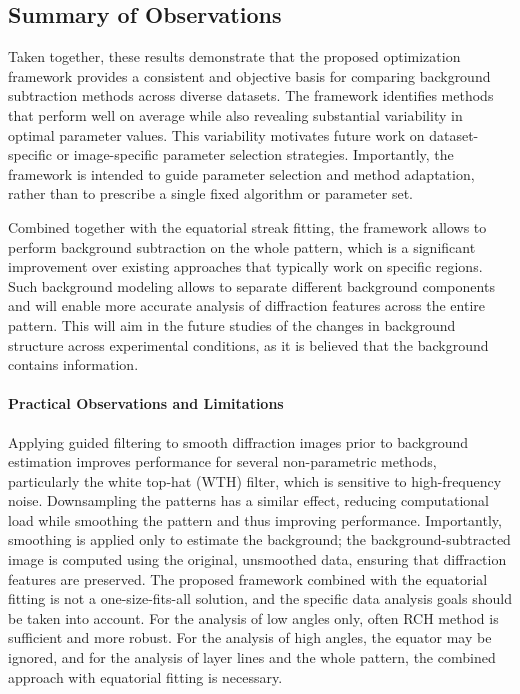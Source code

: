 \documentclass[iucr]{iucrjournals}
\begin{document}
\subsection{Summary of Observations}

Taken together, these results demonstrate that the proposed optimization framework provides a consistent and objective basis for comparing background subtraction methods across diverse datasets. The framework identifies methods that perform well on average while also revealing substantial variability in optimal parameter values. This variability motivates future work on dataset-specific or image-specific parameter selection strategies. Importantly, the framework is intended to guide parameter selection and method adaptation, rather than to prescribe a single fixed algorithm or parameter set.

Combined together with the equatorial streak fitting, the framework allows to perform background subtraction on the whole pattern, which is a significant improvement over existing approaches that typically work on specific regions. Such background modeling allows to separate different background components and will enable more accurate analysis of diffraction features across the entire pattern. This will aim in the future studies of the changes in background structure across experimental conditions, as it is believed that the background contains information. 

\paragraph{Practical Observations and Limitations}
Applying guided filtering to smooth diffraction images prior to background estimation improves performance for several non-parametric methods, particularly the white top-hat (WTH) filter, which is sensitive to high-frequency noise. Downsampling the patterns has a similar effect, reducing computational load while smoothing the pattern and thus improving performance. Importantly, smoothing is applied only to estimate the background; the background-subtracted image is computed using the original, unsmoothed data, ensuring that diffraction features are preserved. The proposed framework combined with the equatorial fitting is not a one-size-fits-all solution, and the specific data analysis goals should be taken into account. For the analysis of low angles only, often RCH method is sufficient and more robust. For the analysis of high angles, the equator may be ignored, and for the analysis of layer lines and the whole pattern, the combined approach with equatorial fitting is necessary.
\end{document}

